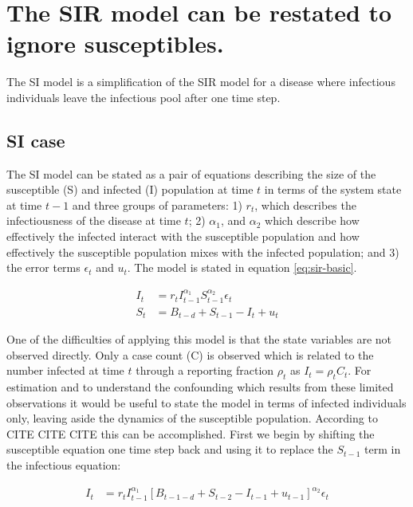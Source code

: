 \chapter{The SIR model can be restated to ignore susceptibles.}\label{chap:sir-nosusceptibles}

The SI model is a simplification of the SIR model for a disease where infectious individuals leave
the infectious pool after one time step.  

\section{SI case}
The SI model  can be stated as a pair of equations describing
the size of the susceptible (S) and infected (I) population at time $t$
in terms of the system state at time $t-1$ and three groups of parameters: 
1) $r_t$, which describes the infectiousness of the disease at time $t$;
2) $\alpha_1$, and $\alpha_2$ which describe how effectively the
infected interact with the susceptible population and how effectively
the susceptible population mixes with the infected population; and 3)
the error terms $\epsilon_t$ and $u_t$.  The model is stated in equation
\ref{eq:sir-basic}.

\begin{align}\label{eq:sir-basic}
I_t &= r_t I_{t-1}^{\alpha_1} S_{t-1}^{\alpha_2} \epsilon_{t} \\
S_t &= B_{t-d} + S_{t-1} - I_t + u_t
\end{align}

One of the difficulties of applying this model is that the state
variables are not observed directly.  Only a case count (C) is observed
which is related to the number infected at time $t$ through a reporting
fraction $\rho_t$ as $I_t = \rho_t C_t$.  For estimation and to
understand the confounding which results from these limited observations
it would be useful to state the model in terms of infected individuals
only, leaving aside the dynamics of the susceptible population.
According to CITE CITE CITE this can be accomplished.  First we begin
by shifting the susceptible equation one time step back and using it to 
replace the $S_{t-1}$ term in the infectious equation:

\begin{align}
I_t &= r_t I_{t-1}^{\alpha_1} 
	\left[
		B_{t-1-d} + S_{t-2} - I_{t-1} + u_{t-1}
	\right]^{\alpha_2} \epsilon_{t} \\
\end{align}

